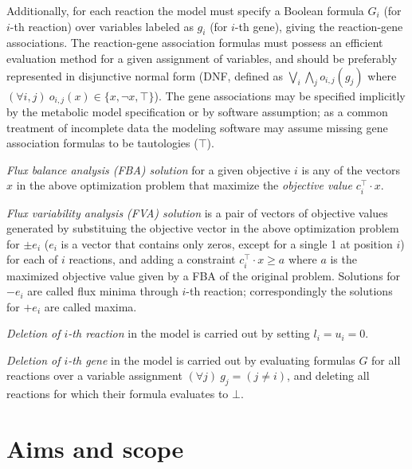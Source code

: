 Additionally, for each reaction the model must specify a Boolean formula $G_i$ (for $i$-th reaction) over variables labeled as $g_i$ (for $i$-th gene), giving the reaction-gene associations. The reaction-gene association formulas must possess an efficient evaluation method for a given assignment of variables, and should be preferably represented in disjunctive normal form (DNF, defined as $\bigvee_i\bigwedge_j o_{i,j}(g_j)$ where $(\forall i,j)\ o_{i,j}(x) \in \{x, \neg x, \top\}$). The gene associations may be specified implicitly by the metabolic model specification or by software assumption; as a common treatment of incomplete data the modeling software may assume missing gene association formulas to be tautologies ($\top$).

\emph{Flux balance analysis (FBA) solution} for a given objective $i$ is any of the vectors $x$ in the above optimization problem that maximize the \emph{objective value} $c_i^\intercal \cdot x$.

\emph{Flux variability analysis (FVA) solution} is a pair of vectors of objective values generated by substituing the objective vector in the above optimization problem for $\pm e_i$ ($e_i$ is a vector that contains only zeros, except for a single 1 at position $i$) for each of $i$ reactions, and adding a constraint $c_i^\intercal\cdot x \geq a$ where $a$ is the maximized objective value given by a FBA of the original problem. Solutions for $-e_i$ are called flux minima through $i$-th reaction; correspondingly the solutions for $+e_i$ are called maxima.

\emph{Deletion of $i$-th reaction} in the model is carried out by setting $l_i = u_i = 0$.

\emph{Deletion of $i$-th gene} in the model is carried out by evaluating formulas $G$ for all reactions over a variable assignment $(\forall j)\ g_j = (j \neq i)$, and deleting all reactions for which their formula evaluates to $\bot$.~\cite{palsson2015systems}


\section{Aims and scope}

